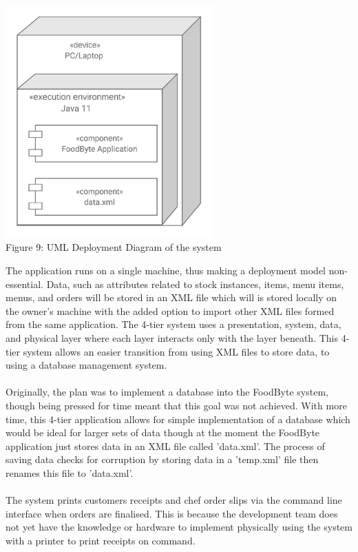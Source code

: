\begin{center}
	\includegraphics[width=8cm]{images/deployment_diagram.png}
	\\
	Figure 9: UML Deployment Diagram of the system
	\\
\end{center}

\noindent The application runs on a single machine, thus making a deployment model non-essential. Data, such as attributes related to stock instances, items, menu items, menus, and orders will be stored in an XML file which will is stored locally on the owner's machine with the added option to import other XML files formed from the same application. The 4-tier system uses a presentation, system, data, and physical layer where each layer interacts only with the layer beneath. This 4-tier system allows an easier transition from using XML files to store data, to using a database management system.
\\ \\
\noindent Originally, the plan was to implement a database into the FoodByte system, though being pressed for time meant that this goal was not achieved. With more time, this 4-tier application allows for simple implementation of a database which would be ideal for larger sets of data though at the moment the FoodByte application just stores data in an XML file called 'data.xml'. The process of saving data checks for corruption by storing data in a 'temp.xml' file then renames this file to 'data.xml'.
\\ \\ 
The system prints customers receipts and chef order slips via the command line interface when orders are finalised. This is because the development team does not yet have the knowledge or hardware to implement physically using the system with a printer to print receipts on command.
\\ \\
